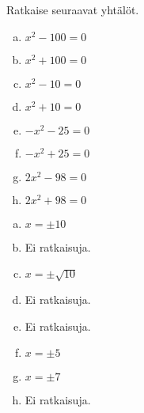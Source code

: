 \begin{tehtava}
    Ratkaise seuraavat yhtälöt.
    \begin{enumerate}[a)]
        \item $x^2 - 100 = 0$
        \item $x^2 + 100 = 0$
        \item $x^2 - 10 = 0$
        \item $x^2 + 10 = 0$
        \item $-x^2 - 25 = 0$
        \item $-x^2 + 25 = 0$
        \item $2x^2 - 98 = 0$
        \item $2x^2 + 98 = 0$
    \end{enumerate}
    \begin{vastaus}
        \begin{enumerate}[a)]
            \item $x=\pm10$
            \item Ei ratkaisuja.
            \item $x=\pm\sqrt{10}$
            \item Ei ratkaisuja.
            \item Ei ratkaisuja.
            \item $x=\pm5$
            \item $x=\pm7$
            \item Ei ratkaisuja.
        \end{enumerate}
    \end{vastaus}
\end{tehtava}

